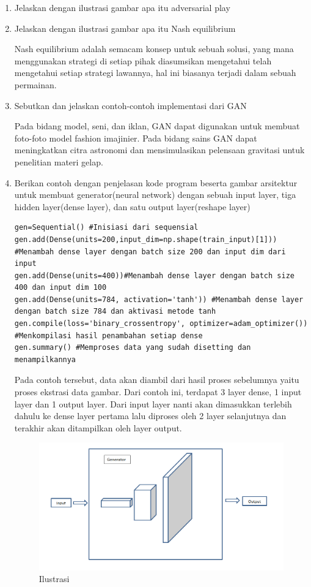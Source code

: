 \begin{enumerate}
\item Jelaskan dengan ilustrasi gambar apa itu adversarial play


\item Jelaskan dengan ilustrasi gambar apa itu Nash equilibrium
\par Nash equilibrium adalah semacam konsep untuk sebuah solusi, yang mana menggunakan strategi di setiap pihak diasumsikan mengetahui telah mengetahui setiap strategi lawannya, hal ini biasanya terjadi dalam sebuah permainan.

\item Sebutkan dan jelaskan contoh-contoh implementasi dari GAN
\par Pada bidang model, seni, dan iklan, GAN dapat digunakan untuk membuat foto-foto model fashion imajinier. Pada bidang sains GAN dapat meningkatkan citra astronomi dan mensimulasikan pelensaan gravitasi untuk penelitian materi gelap.


\item Berikan contoh dengan penjelasan kode program beserta gambar arsitektur untuk membuat generator(neural network) dengan sebuah input layer, tiga hidden layer(dense layer), dan satu output layer(reshape layer)
\begin{verbatim}
gen=Sequential() #Inisiasi dari sequensial
gen.add(Dense(units=200,input_dim=np.shape(train_input)[1])) #Menambah dense layer dengan batch size 200 dan input dim dari input
gen.add(Dense(units=400))#Menambah dense layer dengan batch size 400 dan input dim 100
gen.add(Dense(units=784, activation='tanh')) #Menambah dense layer dengan batch size 784 dan aktivasi metode tanh
gen.compile(loss='binary_crossentropy', optimizer=adam_optimizer()) #Menkompilasi hasil penambahan setiap dense
gen.summary() #Memproses data yang sudah disetting dan menampilkannya
\end{verbatim} 
\par Pada contoh tersebut, data akan diambil dari hasil proses sebelumnya yaitu proses ekstrasi data gambar. Dari contoh ini, terdapat 3 layer dense, 1 input layer dan 1 output layer. Dari input layer nanti akan dimasukkan terlebih dahulu ke dense layer pertama lalu diproses oleh 2 layer selanjutnya dan terakhir akan ditampilkan oleh layer output.
\begin{figure}[ht]
\centering
\includegraphics[scale=0.3]{figures/1174002/chapter8/9.PNG}
\caption{Ilustrasi}
\label{Contoh}
\end{figure}



\end{enumerate}
